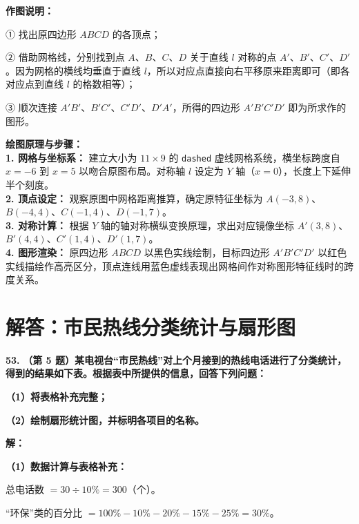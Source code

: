 \documentclass[12pt, a4paper]{ctexrep}
\begin{document}
\vspace{0.4cm}
\textbf{作图说明：}

① 找出原四边形 $ABCD$ 的各顶点；

② 借助网格线，分别找到点 $A$、$B$、$C$、$D$ 关于直线 $l$ 对称的点 $A'$、$B'$、$C'$、$D'$。因为网格的横线均垂直于直线 $l$，所以对应点直接向右平移原来距离即可（即各对应点到直线 $l$ 的格数相等）；

③ 顺次连接 $A'B'$、$B'C'$、$C'D'$、$D'A'$，所得的四边形 $A'B'C'D'$ 即为所求作的图形。

\vspace{0.4cm}
{\small\color{blue!70!black}
\textbf{绘图原理与步骤：}\\
\textbf{1. 网格与坐标系：} 建立大小为 $11 \times 9$ 的 \texttt{dashed} 虚线网格系统，横坐标跨度自 $x=-6$ 到 $x=5$ 以吻合原图布局。对称轴 $l$ 设定为 $Y$ 轴（$x=0$），长度上下延伸半个刻度。\\
\textbf{2. 顶点设定：} 观察原图中网格距离推算，确定原特征坐标为 $A(-3,8)$、$B(-4,4)$、$C(-1,4)$、$D(-1,7)$。\\
\textbf{3. 对称计算：} 根据 $Y$ 轴的轴对称横纵变换原理，求出对应镜像坐标 $A'(3,8)$、$B'(4,4)$、$C'(1,4)$、$D'(1,7)$。\\
\textbf{4. 图形渲染：} 原四边形 $ABCD$ 以黑色实线绘制，目标四边形 $A'B'C'D'$ 以红色实线描绘作高亮区分，顶点连线用蓝色虚线表现出网格间作对称图形特征线时的跨度关系。
}

\newpage

\section{解答：市民热线分类统计与扇形图}

\vspace{0.6cm}

\textbf{\LARGE 53.} \textbf{（第 5 题）某电视台“市民热线”对上个月接到的热线电话进行了分类统计，得到的结果如下表。根据表中所提供的信息，回答下列问题：}

\textbf{（1）将表格补充完整；}

\textbf{（2）绘制扇形统计图，并标明各项目的名称。}

\vspace{0.4cm}
\textbf{解：}

\textbf{（1）数据计算与表格补充：}

总电话数 $= 30 \div 10\% = 300$（个）。

“环保”类的百分比 $= 100\% - 10\% - 20\% - 15\% - 25\% = 30\%$。
\end{document}
